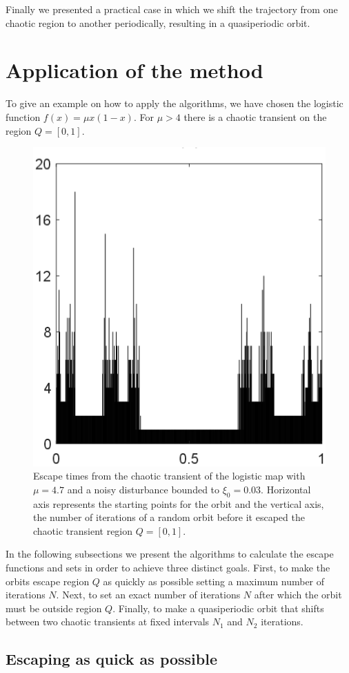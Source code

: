 Finally we presented a practical case in which we shift the trajectory from one chaotic region to another periodically, resulting in a quasiperiodic orbit.

\section{Application of the method}


To give an example on how to apply the algorithms, we have chosen the logistic function $f(x) = \mu x(1-x)$. For $\mu > 4$ there is a chaotic transient on the region $Q=[0,1]$. 

\begin{figure}
    \centering
    \includegraphics[width=0.5\linewidth]{Images/P1/EscapeTimes.eps}
    \caption{Escape times from the chaotic transient of the logistic map with $\mu=4.7$ and a noisy disturbance bounded to $\xi_0 = 0.03$. Horizontal axis represents the starting points for the orbit and the vertical axis, the number of iterations of a random orbit before it escaped the chaotic transient region $Q = [0,1]$.}
    \label{fig:EscapeTimes}
\end{figure}

In the following subsections we present the algorithms to calculate the escape functions and sets in order to achieve three distinct goals. First, to make the orbits escape region $Q$ as quickly as possible setting a maximum number of iterations $N$. Next, to set an exact number of iterations $N$ after which the orbit must be outside region $Q$. Finally, to make a quasiperiodic orbit that shifts between two chaotic transients at fixed intervals $N_1$ and $N_2$ iterations. 

\subsection{Escaping as quick as possible}

